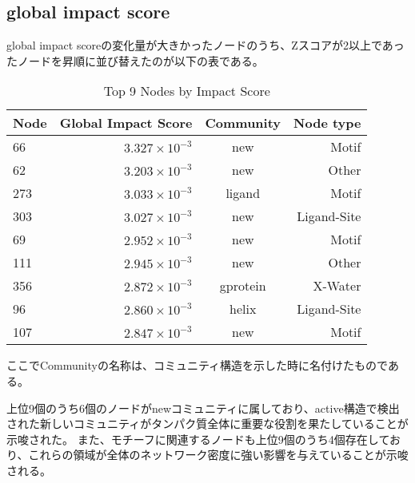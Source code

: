 \subsection{global impact score}
global impact scoreの変化量が大きかったノードのうち、Zスコアが2以上であったノードを昇順に並び替えたのが以下の表である。
\begin{table}[ht]
    \centering
    \begin{tabular}{|l|r|c|r|}
    \hline
    \textbf{Node} & \textbf{Global Impact Score} & \textbf{Community} & \textbf{Node type}\\
    \hline
    66 & \( 3.327 \times 10^{-3} \) & new & Motif \\
    62 & \( 3.203 \times 10^{-3} \) & new & Other \\
    273 & \( 3.033 \times 10^{-3} \) & ligand & Motif \\
    303 & \( 3.027 \times 10^{-3} \) & new & Ligand-Site \\
    69 & \( 2.952 \times 10^{-3} \) & new & Motif \\
    111 & \( 2.945 \times 10^{-3} \) & new & Other \\
    356 & \( 2.872 \times 10^{-3} \) & gprotein & X-Water \\
    96 & \( 2.860 \times 10^{-3} \) & helix & Ligand-Site \\
    107 & \( 2.847 \times 10^{-3} \) & new & Motif \\
    \hline
    \end{tabular}
    \caption{Top 9 Nodes by Impact Score}
\end{table}

\newpage

ここでCommunityの名称は、コミュニティ構造を示した時に名付けたものである。

上位9個のうち6個のノードがnewコミュニティに属しており、active構造で検出された新しいコミュニティがタンパク質全体に重要な役割を果たしていることが示唆された。
また、モチーフに関連するノードも上位9個のうち4個存在しており、これらの領域が全体のネットワーク密度に強い影響を与えていることが示唆される。


